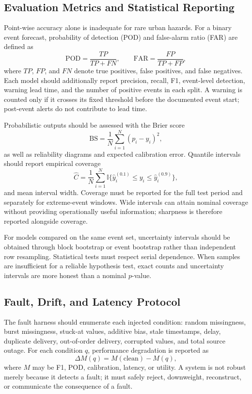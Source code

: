 \documentclass[journal]{IEEEtran}
\begin{document}
\subsection{Evaluation Metrics and Statistical Reporting}
Point-wise accuracy alone is inadequate for rare urban hazards. For a binary event forecast, probability of detection (POD) and false-alarm ratio (FAR) are defined as
\begin{equation}
\mathrm{POD}=\frac{TP}{TP+FN},\qquad \mathrm{FAR}=\frac{FP}{TP+FP},
\label{eq:podfar}
\end{equation}
where $TP$, $FP$, and $FN$ denote true positives, false positives, and false negatives. Each model should additionally report precision, recall, F1, event-level detection, warning lead time, and the number of positive events in each split. A warning is counted only if it crosses its fixed threshold before the documented event start; post-event alerts do not contribute to lead time.

Probabilistic outputs should be assessed with the Brier score
\begin{equation}
\mathrm{BS}=\frac{1}{N}\sum_{i=1}^{N}(p_i-y_i)^2,
\label{eq:brier}
\end{equation}
as well as reliability diagrams and expected calibration error. Quantile intervals should report empirical coverage
\begin{equation}
\widehat{C}=\frac{1}{N}\sum_{i=1}^{N}\mathbb{I}\{\hat y_i^{(0.1)}\leq y_i\leq\hat y_i^{(0.9)}\},
\label{eq:coverage}
\end{equation}
and mean interval width. Coverage must be reported for the full test period and separately for extreme-event windows. Wide intervals can attain nominal coverage without providing operationally useful information; sharpness is therefore reported alongside coverage.

For models compared on the same event set, uncertainty intervals should be obtained through block bootstrap or event bootstrap rather than independent row resampling. Statistical tests must respect serial dependence. When samples are insufficient for a reliable hypothesis test, exact counts and uncertainty intervals are more honest than a nominal $p$-value.

\subsection{Fault, Drift, and Latency Protocol}
The fault harness should enumerate each injected condition: random missingness, burst missingness, stuck-at values, additive bias, stale timestamps, delay, duplicate delivery, out-of-order delivery, corrupted values, and total source outage. For each condition $q$, performance degradation is reported as
\begin{equation}
\Delta M(q)=M(\text{clean})-M(q),
\label{eq:degradation}
\end{equation}
where $M$ may be F1, POD, calibration, latency, or utility. A system is not robust merely because it detects a fault; it must safely reject, downweight, reconstruct, or communicate the consequence of a fault.
\end{document}
